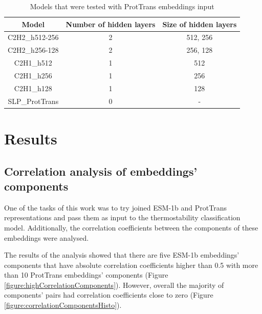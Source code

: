 \documentclass[12pt]{article}
\begin{document}
	\begin{table}[h!]
		\caption{Models that were tested with ProtTrans embeddings input}
		\vspace{0.2cm}
		\centering
		\begin{tabular}{ | c | c c | }
			\hline 
			Model & Number of hidden layers & Size of hidden layers \\
			\hline 
			C2H2\_h512-256 & 2 & 512, 256 \\
			C2H2\_h256-128 & 2 & 256, 128 \\
			C2H1\_h512 & 1 & 512 \\
			C2H1\_h256 & 1 & 256 \\
			C2H1\_h128 & 1 & 128 \\
			SLP\_ProtTrans & 0 & - \\
			\hline    
		\end{tabular}
		\label{table:modelArchitecturesPT}
	\end{table}

	\newpage

	\section{Results}

	\subsection{Correlation analysis of embeddings' components}

	One of the tasks of this work was to try joined ESM-1b and ProtTrans 
	representations and pass them as input to the thermostability 
	classification model. Additionally, the correlation 
	coefficients between the components of these embeddings were analysed. 

	The results of the analysis showed that there are five ESM-1b
	embeddings' components that have absolute correlation coefficients 
	higher than 0.5 with more than 10 ProtTrans embeddings' components  
	(Figure \ref{figure:highCorrelationComponents}). However, overall the 
	majority of components' pairs had correlation coefficients close to zero 
	(Figure \ref{figure:correlationComponentsHisto}).
\end{document}
